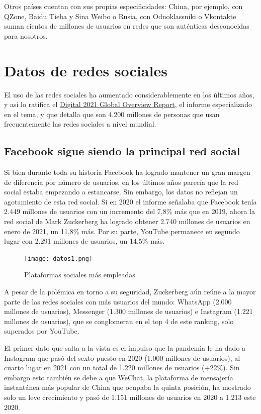 Otros países cuentan con sus propias especificidades: China, por ejemplo, con QZone, Baidu Tieba y Sina Weibo o Rusia, con Odnoklassniki o Vkontakte suman cientos de millones de usuarios en redes que son auténticas desconocidas para nosotros.

\section{Datos de redes sociales}

El uso de las redes sociales ha aumentado considerablemente en los últimos años, y así lo ratifica el \href{https://www.slideshare.net/DataReportal/digital-2021-global-overview-report-january-2021-v01?ref=https://marketing4ecommerce.net/}{Digital 2021 Global Overview Report}, el informe especializado en el tema, y que detalla que son 4.200 millones de personas que usan frecuentemente las redes sociales a nivel mundial.

\subsection{Facebook sigue siendo la principal red social}

Si bien durante toda su historia Facebook ha logrado mantener un gran margen de diferencia por número de usuarios, en los últimos años parecía que la red social estaba empezando a estancarse. Sin embargo, los datos no reflejan un agotamiento de esta red social. Si en 2020 el informe señalaba que Facebook tenía 2.449 millones de usuarios con un incremento del 7,8\% más que en 2019, ahora la red social de Mark Zuckerberg ha logrado obtener 2.740 millones de usuarios en enero de 2021, un 11,8\% más. Por su parte, YouTube permanece en segundo lugar con 2.291 millones de usuarios, un 14,5\% más.

\begin{figure}[ht!]
    \texttt{[image: datos1.png]}
    \caption{Plataformas sociales más empleadas}
    \label{datos1}
\end{figure}

A pesar de la polémica en torno a su seguridad, Zuckerberg aún reúne a la mayor parte de las redes sociales con más usuarios del mundo: WhatsApp (2.000 millones de usuarios), Messenger (1.300 millones de usuarios) e Instagram (1.221 millones de usuarios), que se conglomeran en el top 4 de este ranking, solo superados por YouTube.

El primer dato que salta a la vista es el impulso que la pandemia le ha dado a Instagram que pasó del sexto puesto en 2020 (1.000 millones de usuarios), al cuarto lugar en 2021 con un total de 1.220 millones de usuarios (+22\%). Sin embargo esto también se debe a que WeChat, la plataforma de mensajería instantánea más popular de China que ocupaba la quinta posición, ha mostrado solo un leve crecimiento y pasó de 1.151 millones de usuarios en 2020 a 1.213 este 2020.

